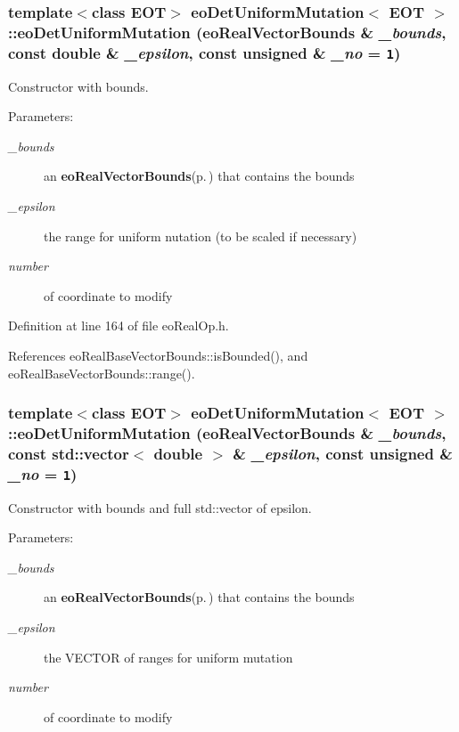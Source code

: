 \subsubsection{\setlength{\rightskip}{0pt plus 5cm}template$<$class EOT$>$ {\bf eo\-Det\-Uniform\-Mutation}$<$ {\bf EOT} $>$::{\bf eo\-Det\-Uniform\-Mutation} ({\bf eo\-Real\-Vector\-Bounds} \& {\em \_\-bounds}, const double \& {\em \_\-epsilon}, const unsigned \& {\em \_\-no} = {\tt 1})\hspace{0.3cm}{\tt  [inline]}}\label{classeo_det_uniform_mutation_a1}


Constructor with bounds. 

\begin{Desc}
\item[Parameters:]
\begin{description}
\item[{\em \_\-bounds}]an {\bf eo\-Real\-Vector\-Bounds}{\rm (p.\,\pageref{classeo_real_vector_bounds})} that contains the bounds \item[{\em \_\-epsilon}]the range for uniform nutation (to be scaled if necessary) \item[{\em number}]of coordinate to modify \end{description}
\end{Desc}


Definition at line 164 of file eo\-Real\-Op.h.

References eo\-Real\-Base\-Vector\-Bounds::is\-Bounded(), and eo\-Real\-Base\-Vector\-Bounds::range().
\subsubsection{\setlength{\rightskip}{0pt plus 5cm}template$<$class EOT$>$ {\bf eo\-Det\-Uniform\-Mutation}$<$ {\bf EOT} $>$::{\bf eo\-Det\-Uniform\-Mutation} ({\bf eo\-Real\-Vector\-Bounds} \& {\em \_\-bounds}, const std::vector$<$ double $>$ \& {\em \_\-epsilon}, const unsigned \& {\em \_\-no} = {\tt 1})\hspace{0.3cm}{\tt  [inline]}}\label{classeo_det_uniform_mutation_a2}


Constructor with bounds and full std::vector of epsilon. 

\begin{Desc}
\item[Parameters:]
\begin{description}
\item[{\em \_\-bounds}]an {\bf eo\-Real\-Vector\-Bounds}{\rm (p.\,\pageref{classeo_real_vector_bounds})} that contains the bounds \item[{\em \_\-epsilon}]the VECTOR of ranges for uniform mutation \item[{\em number}]of coordinate to modify \end{description}
\end{Desc}


